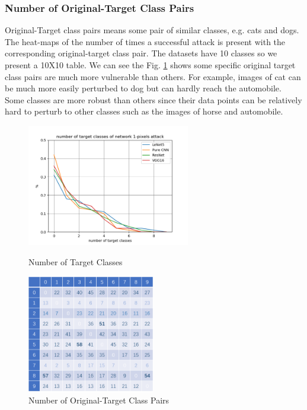 \documentclass[runningheads]{llncs}
\begin{document}
\subsubsection{Number of Original-Target Class Pairs} 
Original-Target class pairs means some pair of similar classes, e.g. cats and dogs. The heat-maps of the number of times a successful attack is present with the corresponding original-target class pair. The datasets have 10 classes so we present a 10X10 table. We can see the Fig. \ref{result4} shows some specific original target class pairs are much more vulnerable than others. For example, images of cat can be much more easily perturbed to dog but can hardly reach the automobile. Some classes are more robust than others since their data points can be relatively hard to perturb to other classes such as the images of horse and automobile. 

\begin{figure}[h]
	\begin{minipage}[t]{0.5\textwidth}
		\includegraphics[width=2.8in]{figures/result3.png}
		\caption{Number of Target Classes} \label{result3}
	\end{minipage}
	\qquad
	\begin{minipage}[t]{0.5\textwidth}
		\includegraphics[width=2.2in]{figures/result4.png}
		\caption{Number of Original-Target Class Pairs} \label{result4}
	\end{minipage}
\end{figure}
\end{document}
